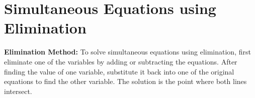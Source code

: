 \documentclass[12pt, a4paper, addpoints]{exam}
\begin{document}
\thispagestyle{empty} 
\section*{Simultaneous Equations using Elimination}

\begin{mdframed}[backgroundcolor=gray!20] %
\textbf{Elimination Method:} To solve simultaneous equations using elimination, first eliminate one of the variables by adding or subtracting the equations. After finding the value of one variable, substitute it back into one of the original equations to find the other variable. The solution is the point where both lines intersect.
\end{mdframed}
\Large
\newpage
\begin{questions}

\newpage

\newpage


\end{questions}
\end{document}
